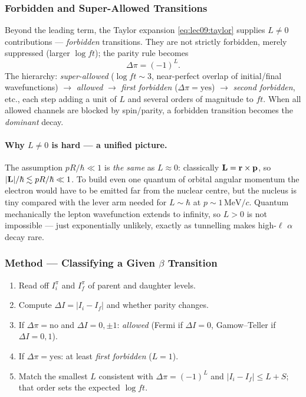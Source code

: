 \subsubsection*{Forbidden and Super-Allowed Transitions}
Beyond the leading term, the Taylor expansion \eqref{eq:lec09:taylor} supplies
$L\neq0$ contributions --- \emph{forbidden} transitions. They are not strictly
forbidden, merely suppressed (larger $\log ft$); the parity rule becomes
\begin{equation}
  \label{eq:lec09:forbidden_parity}
  \boxed{\Delta\pi = (-1)^{L}.}
\end{equation}
The hierarchy: \emph{super-allowed} ($\log ft\sim3$, near-perfect overlap of
initial/final wavefunctions) $\to$ \emph{allowed} $\to$ \emph{first forbidden}
($\Delta\pi=\text{yes}$) $\to$ \emph{second forbidden}, etc., each step adding a
unit of $L$ and several orders of magnitude to $ft$. When all allowed channels
are blocked by spin/parity, a forbidden transition becomes the \emph{dominant}
decay.

\paragraph{Why $L\!\neq\!0$ is hard --- a unified picture.}
The assumption $pR/\hbar\ll1$ is \emph{the same} as $L\approx0$: classically
$\mathbf{L}=\mathbf{r}\times\mathbf{p}$, so $|\mathbf{L}|/\hbar \lesssim pR/\hbar\ll1$. To
build even one quantum of orbital angular momentum the electron would have to be
emitted far from the nuclear centre, but the nucleus is tiny compared with the
lever arm needed for $L\sim\hbar$ at $p\sim1\,\text{MeV}/c$. Quantum mechanically
the lepton wavefunction extends to infinity, so $L>0$ is not impossible --- just
exponentially unlikely, exactly as tunnelling makes high-$\ell$ $\alpha$ decay
rare.

\subsubsection*{Method --- Classifying a Given $\beta$ Transition}
\begin{enumerate}[label=\arabic*.,nosep]
  \item Read off $I^\pi_i$ and $I^\pi_f$ of parent and daughter levels.
  \item Compute $\Delta I=|I_i-I_f|$ and whether parity changes.
  \item If $\Delta\pi=\text{no}$ and $\Delta I=0,\pm1$: \emph{allowed}
        (Fermi if $\Delta I=0$, Gamow--Teller if $\Delta I=0,1$).
  \item If $\Delta\pi=\text{yes}$: at least \emph{first forbidden} ($L=1$).
  \item Match the smallest $L$ consistent with
        $\Delta\pi=(-1)^L$ and $|I_i-I_f|\le L+S$; that order sets the expected
        $\log ft$.
\end{enumerate}

